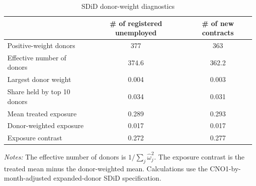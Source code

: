 \begin{table}[!htbp]
\centering
\caption{SDiD donor-weight diagnostics}
\label{tab:v1_sdid_weight_diagnostics}
\begin{threeparttable}
\small
\begin{tabular}{lcc}
\toprule
& \# of registered unemployed & \# of new contracts \\
\midrule
Positive-weight donors & 377 & 363 \\
Effective number of donors & 374.6 & 362.2 \\
Largest donor weight & 0.004 & 0.003 \\
Share held by top 10 donors & 0.034 & 0.031 \\
Mean treated exposure & 0.289 & 0.293 \\
Donor-weighted exposure & 0.017 & 0.017 \\
Exposure contrast & 0.272 & 0.277 \\
\bottomrule
\end{tabular}
\begin{tablenotes}[flushleft]
\footnotesize
\item \emph{Notes:} The effective number of donors is \(1/\sum_j\widehat{\omega}_j^2\). The exposure contrast is the treated mean minus the donor-weighted mean. Calculations use the CNO1-by-month-adjusted expanded-donor SDiD specification.
\end{tablenotes}
\end{threeparttable}
\end{table}
